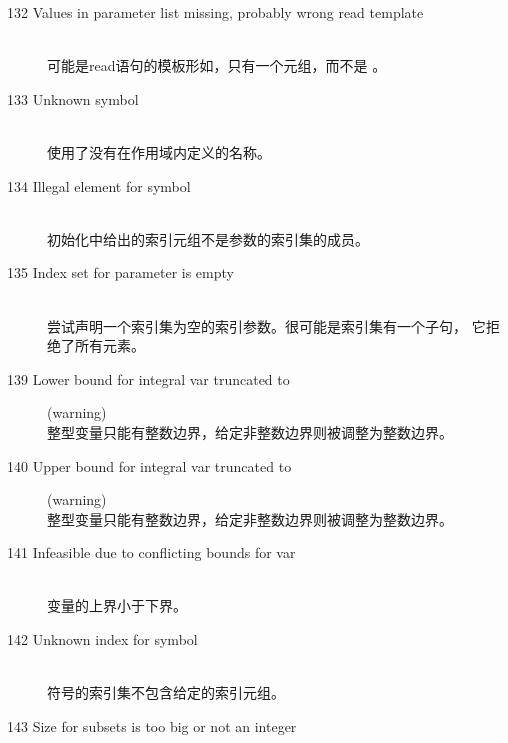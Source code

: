 \begin{description}
\item[132 Values in parameter list missing, probably wrong read
  template]\ \\
  可能是read语句的模板形如，只有一个元组，而不是
  。
\item[133 Unknown symbol ]\ \\
  使用了没有在作用域内定义的名称。
\item[134 Illegal element  for symbol]\ \\
  初始化中给出的索引元组不是参数的索引集的成员。
\item[135 Index set for parameter  is empty]\ \\
  尝试声明一个索引集为空的索引参数。很可能是索引集有一个子句，
  它拒绝了所有元素。
%
%
\item[139 Lower bound for integral var  truncated to ]
  (warning)\ \\
  整型变量只能有整数边界，给定非整数边界则被调整为整数边界。
\item[140 Upper bound for integral var  truncated to ]
  (warning)\ \\
  整型变量只能有整数边界，给定非整数边界则被调整为整数边界。
\item[141 Infeasible due to conflicting bounds for var ]\ \\
  变量的上界小于下界。
\item[142 Unknown index  for symbol ]\ \\
  符号的索引集不包含给定的索引元组。
\item[143 Size for subsets  is too big or not an integer]\ \\

\end{description}
